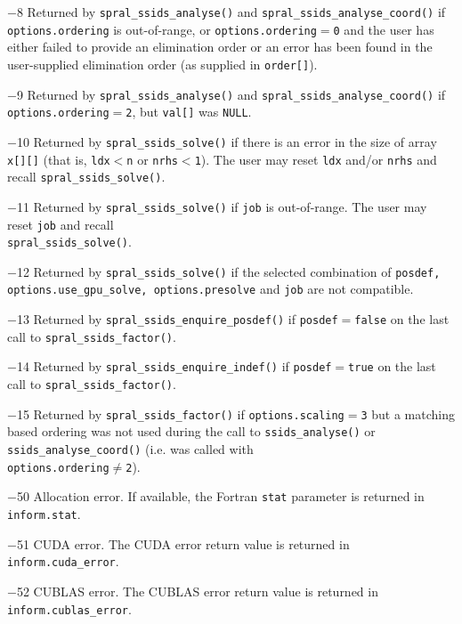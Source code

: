 \begin{description}
\item{$-$8} Returned by {\tt spral\_ssids\_analyse()}  and
            {\tt spral\_ssids\_analyse\_coord()} if {\tt options.ordering} is
            out-of-range, or {\tt options.ordering}$=${\tt 0} and the user
            has either failed to provide an elimination order or an error has
            been found in the user-supplied elimination order (as supplied in
            {\tt order[]}).
\item{$-$9} Returned by {\tt spral\_ssids\_analyse()} and
            {\tt spral\_ssids\_analyse\_coord()} if {\tt options.ordering}$=${\tt 2},
            but {\tt val[]} was \texttt{NULL}.
\item{$-$10} Returned by {\tt spral\_ssids\_solve()} if there is an error in the size
            of array {\tt x[][]} (that is, {\tt ldx$<$n} or {\tt nrhs$<$1}).
            The user may reset {\tt ldx} and/or {\tt nrhs} and recall
            {\tt spral\_ssids\_solve()}.
\item{$-$11} Returned by {\tt spral\_ssids\_solve()} if {\tt job} is out-of-range.
            The user may reset {\tt job} and recall \\
            {\tt spral\_ssids\_solve()}.
\item{$-$12} Returned by {\tt spral\_ssids\_solve()} if the selected combination of
            {\tt posdef{\rm ,} options.use\_gpu\_solve{\rm ,}
            options.presolve} and {\tt job} are not compatible.
\item{$-$13} Returned by {\tt spral\_ssids\_enquire\_posdef()} if
            {\tt posdef}$=${\tt false} on the last call
            to {\tt spral\_ssids\_factor()}.
\item{$-$14} Returned by {\tt spral\_ssids\_enquire\_indef()} if
            {\tt posdef}$=${\tt true} on the last call to
            {\tt spral\_ssids\_factor()}.
\item{$-$15} Returned by {\tt spral\_ssids\_factor()} if {\tt options.scaling$=$3}
            but a matching based ordering was not used during the call to
            {\tt ssids\_analyse()} or {\tt ssids\_analyse\_coord()} (i.e. was
            called with \\
            {\tt options.ordering}$\ne${\tt 2}).
\item{$-$50} Allocation error. If available, the Fortran {\tt stat}
            parameter is returned in {\tt inform.stat}.
\item{$-$51} CUDA error. The CUDA error return value is returned in
            {\tt inform.cuda\_error}.
\item{$-$52} CUBLAS error. The CUBLAS error return value is returned in
            {\tt inform.cublas\_error}.
\end{description}
